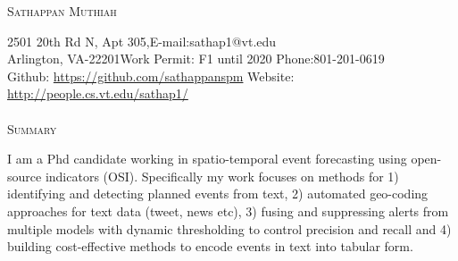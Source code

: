 \documentclass[a4paper]{article}
\newcommand{\lineunder} {\vspace*{-8pt} \\
    \hspace*{-18pt} \hrulefill \\
}
\newcommand{\header} [1] {{\hspace*{-18pt}\vspace*{6pt}\large {\textsc{#1}}}
    \vspace*{-6pt} %
}
\begin{document}

\vspace*{-35pt}

\begin{center}
	{\huge \scshape {Sathappan Muthiah}}\\
\end{center}
\small
2501 20th Rd N, Apt 305,\hfill E-mail:sathap1@vt.edu\\
Arlington, VA-22201\hfill Work Permit: F1 until 2020 \hfill
Phone:801-201-0619 \\
Github: \url{https://github.com/sathappanspm} \hfill Website:
\url{http://people.cs.vt.edu/sathap1/}  \normalsize \lineunder

%

\iffalse
\header{Summary}

I am a Phd candidate working in applied Natural Language Processing (NLP).
My research involves understanding and extracting necessary information
from text (obtained from Open source Indicators (OSI) like Twitter,
News, Blogs, etc.) with additional understanding of uncertainty and
other constraints like minimal coverage, availability of human
supervision time etc., for creating cost-effective tabular event data which has applications in
event forecasting and healthcare research. My work has led to
publications in top-tier data mining conferences like KDD, IAAI, IJCAI,
CIKM, etc. 
\fi


\header{Summary}

I am a Phd candidate working in spatio-temporal event forecasting using
open-source indicators (OSI). Specifically my work focuses on methods
for 1) identifying and
detecting planned events from text, 2) automated geo-coding approaches
for text data (tweet, news etc), 3) fusing and suppressing alerts from
multiple models with dynamic thresholding to control precision and
recall and 4) building cost-effective methods to encode events in text
into tabular form.  %
\end{document}
